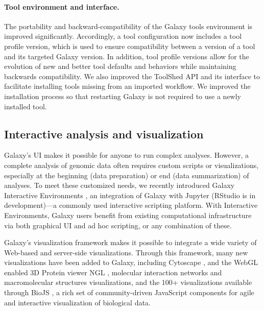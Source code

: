 \paragraph*{Tool environment and interface.}
The portability and backward-compatibility of the Galaxy tools environment is improved significantly. Accordingly, a tool configuration now includes a tool profile version, which is used to ensure compatibility between a version of a tool and its targeted Galaxy version. In addition, tool profile versions allow for the evolution of new and better tool defaults and behaviors while maintaining backwards compatibility. We also improved the ToolShed API and its interface to facilitate installing tools missing from an imported workflow. We improved the installation process so that restarting Galaxy is not required to use a newly installed tool.

\subsection*{Interactive analysis and visualization}
Galaxy’s UI makes it possible for anyone to run complex analyses. However, a complete analysis of genomic data often requires custom scripts or visualizations, especially at the beginning (data preparation) or end (data summarization) of analyses. To meet these customized needs, we recently introduced Galaxy Interactive Environments \cite{gruning2017jupyter}, an integration of Galaxy with Jupyter (RStudio is in development)—a commonly used interactive scripting platform. With Interactive Environments, Galaxy users benefit from existing computational infrastructure via both graphical UI and ad hoc scripting, or any combination of these.

Galaxy’s visualization framework \cite{goecks2013web} makes it possible to integrate a wide variety of Web-based and server-side visualizations. Through this framework, many new visualizations have been added to Galaxy, including Cytoscape \cite{shannon2003cytoscape}, and the WebGL enabled 3D Protein viewer NGL \cite{rose2015ngl}, molecular interaction networks and macromolecular structures visualizations, and the 100+ visualizations available through BioJS \cite{gomez2013biojs}, a rich set of community-driven JavaScript components for agile and interactive visualization of biological data.

